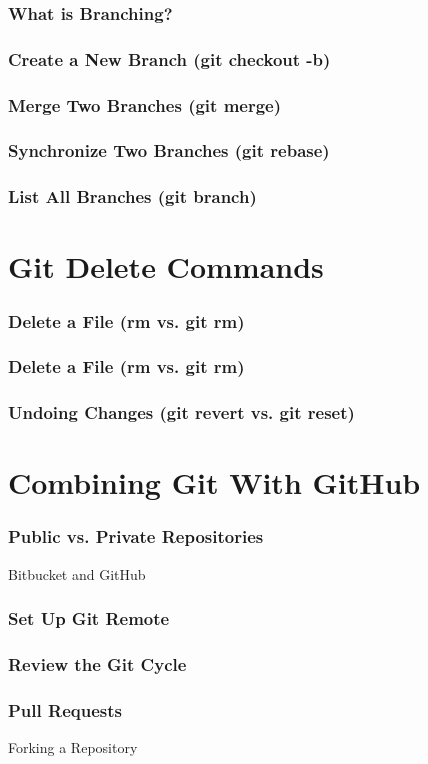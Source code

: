 \begin{frame}
    \frametitle{What is Branching?}
\end{frame}

\begin{frame}
    \frametitle{Create a New Branch (git checkout -b)}
\end{frame}

\begin{frame}
    \frametitle{Merge Two Branches (git merge)}
\end{frame}

\begin{frame}
    \frametitle{Synchronize Two Branches (git rebase)}
\end{frame}

\begin{frame}
    \frametitle{List All Branches (git branch)}
\end{frame}


\section[Delete]{Git Delete Commands}
\begin{frame}
    \frametitle{Delete a File (rm vs. git rm)}
\end{frame}

\begin{frame}
    \frametitle{Delete a File (rm vs. git rm)}
\end{frame}

\begin{frame}
    \frametitle{Undoing Changes (git revert vs. git reset)}
\end{frame}


\section[GitHub]{Combining Git With GitHub}
\begin{frame}
    \frametitle{Public vs. Private Repositories}
    Bitbucket and GitHub
\end{frame}

\begin{frame}
    \frametitle{Set Up Git Remote}
\end{frame}


\begin{frame}
    \frametitle{Review the Git Cycle}
\end{frame}

\begin{frame}
    \frametitle{Pull Requests}
    Forking a Repository
\end{frame}


\begin{frame}
\frametitle{\large{}}
	\huge{\center{\color{RUBblau}{Thank you for your attention.}}}
\end{frame}


